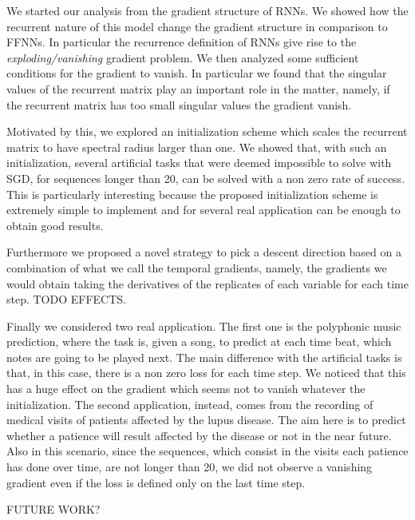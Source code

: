 We started our analysis from the gradient structure of RNNs. We showed how the recurrent nature of this model change the gradient structure in comparison to FFNNs. In particular the recurrence definition of RNNs give rise to the \textit{exploding/vanishing} gradient problem. We then analyzed some sufficient conditions for the gradient to vanish. In particular we found that the singular values of the recurrent matrix play an important role in the matter, namely, if the recurrent matrix has too small singular values the gradient vanish.

Motivated by this, we explored an initialization scheme which scales the recurrent matrix to have spectral radius larger than one. We showed that, with such an initialization, several artificial tasks that were deemed impossible to solve with SGD, for sequences longer than 20, can be solved with a non zero rate of success. This is particularly interesting because the proposed initialization scheme is extremely simple to implement and for several real application can be enough to obtain good results. 

Furthermore we proposed a novel strategy to pick a descent direction based on a combination of what we call the temporal gradients, namely, the gradients we would obtain taking the derivatives of the replicates of each variable for each time step. TODO EFFECTS. 

Finally we considered two real application. The first one is the polyphonic music prediction, where the task is, given a song, to predict at each time beat, which notes are going to be played next. The main difference with the artificial tasks is that, in this case, there is a non zero loss for each time step. We noticed that this has a huge effect on the gradient which seems not to vanish whatever the initialization. The second application, instead, comes from the recording of medical visits of patients affected by the lupus disease. The aim here is to predict whether a patience will result affected by the disease or not in the near future. Also in this scenario, since the sequences, which consist in the visits each patience has done over time, are not longer than 20, we did not observe a vanishing gradient even if the loss is defined only on the last time step. 

FUTURE WORK?